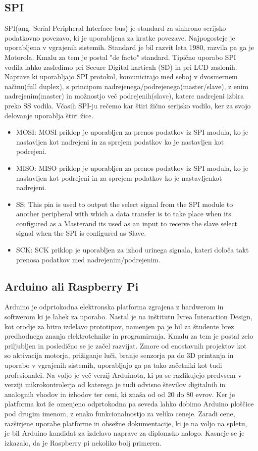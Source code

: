 \documentclass[12pt,a4paper,titlepage,openany]{report}
\begin{document}
\subsection{SPI}
SPI(ang. Serial Peripheral Interface bus) je standard za sinhrono serijsko podatkovno povezavo, ki je uporabljena za kratke povezave. Najpogosteje je uporabljena v vgrajenih sistemih. Standard je bil razvit leta 1980, razvila pa ga je Motorola. Kmalu za tem je postal "de facto" standard. Tipično uporabo SPI vodila lahko zasledimo pri Secure Digital karticah (SD) in pri LCD zaslonih. Naprave ki uporabljajo SPI protokol, komunicirajo med seboj v dvosmernem načinu(full duplex), s principom nadrejenega/podrejenega(master/slave), z enim nadrejenim(master) in možnostjo več podrejenih(slave), katere nadrejeni izbira preko SS vodila. Včasih SPI-ju rečemo kar štiri žično serijsko vodilo, ker za svojo delovanje uporablja štiri žice.

\begin{itemize}
\item MOSI: MOSI priklop je uporabljen za prenos podatkov iz SPI modula, ko je nastavljen kot nadrejeni in za sprejem podatkov ko je nastavljen kot podrejeni.
\item MISO: MISO priklop je uporabljen za prenos podatkov iz SPI modula, ko je nastavljen kot podrejeni in za sprejem podatkov ko je nastavljenkot nadrejeni.
\item SS: This pin is used to output the select signal from the SPI module to another peripheral with which a data transfer is to take place when its configured as a Masterand its used as an input to receive the slave select signal when the SPI is configured as Slave.
\item SCK: SCK priklop je uporabljen za izhod urinega signala, kateri določa takt prenosa podatkov med nadrejenim/podrejenim.
\end{itemize}

\subsection{Arduino ali Raspberry Pi}
Arduino je odprtokodna elektronska platforma zgrajena z hardwerom in softwerom ki je lahek za uporabo. Nastal je na inštitutu Ivrea Interaction Design, kot orodje za hitro izdelavo prototipov, namenjen pa je bil za študente brez predhodnega znanja elektrotehnike in programiranja. Kmalu za tem je postal zelo priljubljen in posledično se je začel razvijat. Zmore od enostavnih projektov kot so aktivacija motorja, prižiganje luči, branje senzorja pa do 3D printanja in uporabo v vgrajenih sistemih, uporabljajo ga pa tako začetniki kot tudi profesionalci. Na voljo je več verzij Arduinota, ki pa se razlikujejo predvsem v verziji mikrokontrolerja od katerega je tudi odvisno številov digitalnih in analognih vhodov in izhodov ter ceni, ki znaša od od 20 do 80 evrov. Ker je platforma kot že omenjeno odprtokodna pa seveda lahko dobimo Arduino ploščice pod drugim imenom, z enako funkcionalnostjo za veliko ceneje. Zaradi cene, razširjene uporabe platforme in obsežne dokumentacije, ki je na voljo na spletu, je bil Arduino kandidat za izdelavo naprave za diplomsko nalogo. Kasneje se je izkazalo, da je Raspberry pi nekoliko bolj     primeren.
\end{document}
